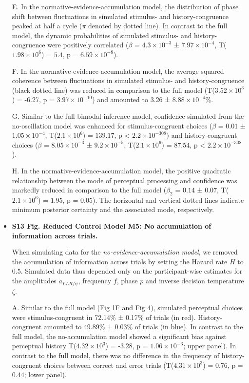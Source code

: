\documentclass[
]{article}
\begin{document}
\begin{itemize}
E. In the normative-evidence-accumulation model, the distribution of
phase shift between fluctuations in simulated stimulus- and
history-congruence peaked at half a cycle (\(\pi\) denoted by dotted
line). In contrast to the full model, the dynamic probabilities of
simulated stimulus- and history-congruence were positively correlated
(\(\beta\) = \(\ensuremath{4.3\times 10^{-3}}\) ±
\(\ensuremath{7.97\times 10^{-4}}\),
T(\(\ensuremath{1.98\times 10^{6}}\)) = \(5.4\), p =
\(\ensuremath{6.59\times 10^{-8}}\)).

F. In the normative-evidence-accumulation model, the average squared
coherence between fluctuations in simulated stimulus- and
history-congruence (black dotted line) was reduced in comparison to the
full model (T(\ensuremath{3.52\times 10^{3}}) = -6.27, p =
\(\ensuremath{3.97\times 10^{-10}}\)) and amounted to 3.26 ±
\ensuremath{8.88\times 10^{-4}}\%.

G. Similar to the full bimodal inference model, confidence simulated
from the no-oscillation model was enhanced for stimulus-congruent
choices (\(\beta\) = \(0.01\) ± \(\ensuremath{1.05\times 10^{-4}}\),
T(\(\ensuremath{2.1\times 10^{6}}\)) = \(139.17\), p < \(\ensuremath{2.2\times 10^{-308}}\)) and
history-congruent choices (\(\beta\) =
\(\ensuremath{8.05\times 10^{-3}}\) ±
\(\ensuremath{9.2\times 10^{-5}}\), T(\(\ensuremath{2.1\times 10^{6}}\))
= \(87.54\), p < \(\ensuremath{2.2\times 10^{-308}}\)).

H. In the normative-evidence-accumulation model, the positive quadratic
relationship between the mode of perceptual processing and confidence
was markedly reduced in comparison to the full model (\(\beta_2\) =
\(0.14\) ± \(0.07\), T(\(\ensuremath{2.1\times 10^{6}}\)) = \(1.95\), p
= \(0.05\)). The horizontal and vertical dotted lines indicate minimum
posterior certainty and the associated mode, respectively.

\item \textbf{S13 Fig. Reduced Control Model M5: No accumulation of information across trials.}

When simulating data for the
\emph{no-evidence-accumulation model}, we removed the accumulation of
information across trials by setting the Hazard rate \(H\) to 0.5.
Simulated data thus depended only on the participant-wise estimates for
the amplitudes \(a_{LLR/\psi}\), frequency \(f\), phase \(p\) and
inverse decision temperature \(\zeta\).

A. Similar to the full model (Fig 1F and Fig 4), simulated
perceptual choices were stimulus-congruent in 72.14\% ± 0.17\% of trials
(in red). History-congruent amounted to 49.89\% ± 0.03\% of trials (in
blue). In contrast to the full model, the no-accumulation model showed a
significant bias against perceptual history
T(\ensuremath{4.32\times 10^{3}}) = -3.28, p =
\(\ensuremath{1.06\times 10^{-3}}\); upper panel). In contrast to the
full model, there was no difference in the frequency of
history-congruent choices between correct and error trials
(T(\ensuremath{4.31\times 10^{3}}) = 0.76, p = \(0.44\); lower panel).


\end{itemize}
\end{document}
